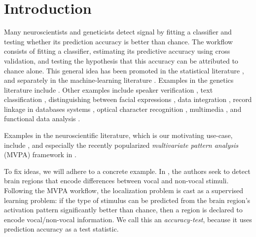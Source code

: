 \documentclass[]{bio}
\begin{document}
\section{Introduction}
\label{sec:introduction}

Many neuroscientists and geneticists detect signal by fitting a classifier and testing whether its prediction accuracy is better than chance. 
The workflow consists of fitting a classifier, estimating its predictive accuracy using cross validation, and testing the hypothesis that this accuracy can be attributed to chance alone. 
This general idea has been promoted in the statistical literature \citep{friedman2003multivariate}, and separately in the machine-learning literature \citep{eric2008testing,ojala_permutation_2010,lopez2016revisiting}.
Examples in the genetics literature include \cite{golub_molecular_1999,slonim_class_2000,radmacher_paradigm_2002,mukherjee_estimating_2003,juan_prediction_2004,jiang_calculating_2008,yu2007two}.
Other examples include 
speaker verification \citep{gretton_kernel_2012-1}, 
text classification \citep{dhillon2003divisive,lopez2016revisiting}, 
distinguishing between facial expressions \citep{lopez2016revisiting}, 
data integration \citep{gretton_kernel_2012-1}, 
record linkage in databases systems \citep{gretton_kernel_2012-1,hall2002permutation,zhou2018statistical}, 
optical character recognition \citep{perez2009estimation}, 
multimedia \citep{moreno2004kullback}, 
and functional data analysis \citep{hall2002permutation}.

Examples in the neuroscientific literature, which is our motivating use-case, include \cite{golland_permutation_2003,pereira_machine_2009,schreiber2013statistical,olivetti2013kernel,varoquaux_assessing_2016}, and especially the recently popularized \emph{multivariate pattern analysis} (MVPA) framework in \cite{kriegeskorte_information-based_2006}.

To fix ideas, we will adhere to a concrete example.
In \cite{gilron_quantifying_2016}, the authors seek to detect brain regions that encode differences between vocal and non-vocal stimuli. 
Following the MVPA workflow, the localization problem is cast as a supervised learning problem: if the type of stimulus can be predicted from the brain region's activation pattern significantly better than chance, then a region is declared to encode vocal/non-vocal information. 
We call this an \emph{accuracy-test}, because it uses prediction accuracy as a test statistic. 
\end{document}
